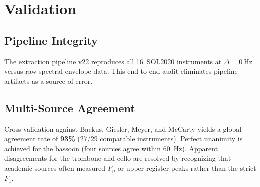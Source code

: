 \documentclass[journal]{IEEEtran}
\newcommand{\Fp}{F_\mathrm{p}}
\newcommand{\Fn}[1]{F_{#1}}
\begin{document}
\section{Validation}
\label{sec:validation}

\subsection{Pipeline Integrity}
The extraction pipeline v22 reproduces all 16~SOL2020 instruments at $\Delta = \SI{0}{\hertz}$ versus raw spectral envelope data. This end-to-end audit eliminates pipeline artifacts as a source of error.

\subsection{Multi-Source Agreement}
Cross-validation against Backus, Giesler, Meyer, and McCarty yields a global agreement rate of \textbf{93\%} (27/29 comparable instruments). Perfect unanimity is achieved for the bassoon (four sources agree within \SI{60}{\hertz}). Apparent disagreements for the trombone and cello are resolved by recognizing that academic sources often measured $\Fp$ or upper-register peaks rather than the strict $\Fn{1}$.
\end{document}
